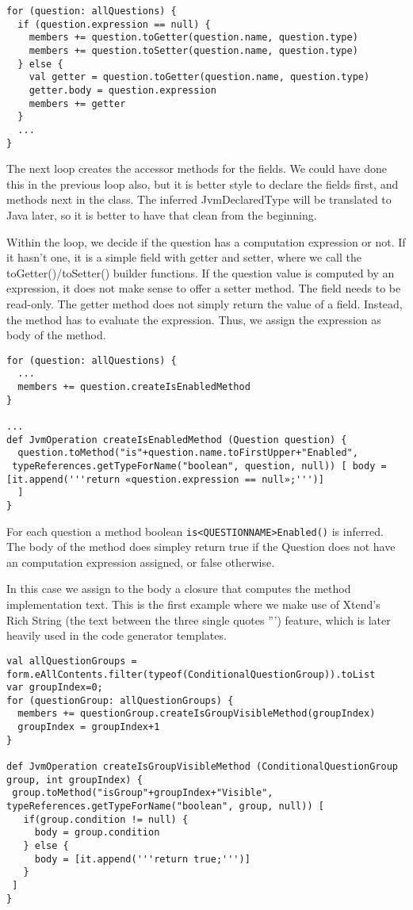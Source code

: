 \begin{lstlisting}[language=Xtend]
for (question: allQuestions) {
  if (question.expression == null) {
    members += question.toGetter(question.name, question.type)
    members += question.toSetter(question.name, question.type)
  } else {
    val getter = question.toGetter(question.name, question.type)
    getter.body = question.expression
    members += getter
  }
  ...
}
\end{lstlisting}

The next loop creates the accessor methods for the fields. We could have done
this in the previous loop also, but it is better style to declare the fields
first, and methods next in the class. The inferred JvmDeclaredType will be
translated to Java later, so it is better to have that clean from the beginning.

Within the loop, we decide if the question has a computation expression or not.
If it hasn't one, it is a simple field with getter and setter, where we call the
toGetter()/toSetter() builder functions. If the question value is computed by an
expression, it does not make sense to offer a setter method. The field needs to
be read-only. The getter method does not simply return the value of a field.
Instead, the method has to evaluate the expression. Thus, we assign the
expression as body of the method.

\begin{lstlisting}[language=Xtend]
for (question: allQuestions) {
  ...
  members += question.createIsEnabledMethod
}

...
def JvmOperation createIsEnabledMethod (Question question) {
  question.toMethod("is"+question.name.toFirstUpper+"Enabled",
 typeReferences.getTypeForName("boolean", question, null)) [ body = [it.append('''return «question.expression == null»;''')]
  ]
}
\end{lstlisting}

For each question a method boolean \texttt{is<QUESTIONNAME>Enabled()} is
inferred. The body of the method does simpley return true if the Question does
not have an computation expression assigned, or false otherwise.

In this case we assign to the body a closure that computes the method
implementation text. This is the first example where we make use of Xtend's Rich
String (the text between the three single quotes ''') feature, which is later
heavily used in the code generator templates.

\begin{lstlisting}[language=Xtend]
val allQuestionGroups = form.eAllContents.filter(typeof(ConditionalQuestionGroup)).toList
var groupIndex=0;
for (questionGroup: allQuestionGroups) {
  members += questionGroup.createIsGroupVisibleMethod(groupIndex)
  groupIndex = groupIndex+1
}

def JvmOperation createIsGroupVisibleMethod (ConditionalQuestionGroup group, int groupIndex) {
 group.toMethod("isGroup"+groupIndex+"Visible", typeReferences.getTypeForName("boolean", group, null)) [
   if(group.condition != null) {
     body = group.condition
   } else {
     body = [it.append('''return true;''')]
   }
 ]
}
\end{lstlisting}

